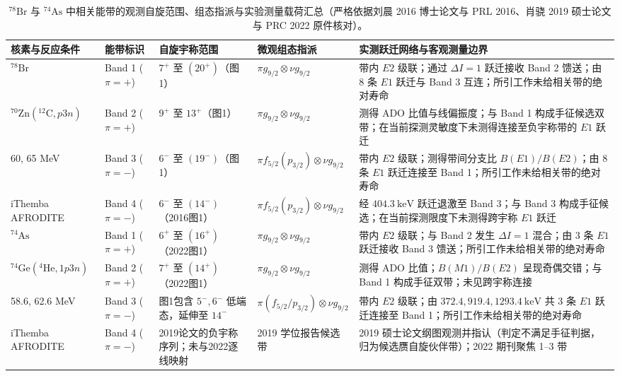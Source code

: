\begin{table}[!htbp]
\centering
\small
\caption{$^{78}\mathrm{Br}$ 与 $^{74}\mathrm{As}$ 中相关能带的观测自旋范围、组态指派与实验测量载荷汇总（严格依据刘晨 2016 博士论文与 PRL 2016、肖骁 2019 硕士论文与 PRC 2022 原件核对）。}\label{tab:4-5-bands-summary}
\begin{tabularx}{\textwidth}{llp{2.6cm}p{3.2cm}X}
\hline\hline
核素与反应条件 & 能带标识 & 自旋宇称范围 & 微观组态指派 & 实测跃迁网络与客观测量边界 \\
\hline
$^{78}\mathrm{Br}$ & Band 1 ($\pi=+$) & $7^+$ 至 $(20^+)$（图1） & $\pi g_{9/2} \otimes \nu g_{9/2}$ & 带内 $E2$ 级联；通过 $\Delta I=1$ 跃迁接收 Band 2 馈送；由 8 条 $E1$ 跃迁与 Band 3 互连；所引工作未给相关带的绝对寿命 \\
$^{70}\mathrm{Zn}(^{12}\mathrm{C}, p3n)$ & Band 2 ($\pi=+$) & $9^+$ 至 $13^+$（图1） & $\pi g_{9/2} \otimes \nu g_{9/2}$ & 测得 ADO 比值与线偏振度；与 Band 1 构成手征候选双带；在当前探测灵敏度下未测得连接至负宇称带的 $E1$ 跃迁 \\
60, 65 MeV & Band 3 ($\pi=-$) & $6^-$ 至 $(19^-)$（图1） & $\pi f_{5/2}(p_{3/2}) \otimes \nu g_{9/2}$ & 带内 $E2$ 级联；测得带间分支比 $B(E1)/B(E2)$；由 8 条 $E1$ 跃迁连接至 Band 1；所引工作未给相关带的绝对寿命 \\
iThemba AFRODITE & Band 4 ($\pi=-$) & $6^-$ 至 $(14^-)$（2016图1） & $\pi f_{5/2}(p_{3/2}) \otimes \nu g_{9/2}$ & 经 $404.3\ \mathrm{keV}$ 跃迁退激至 Band 3；与 Band 3 构成手征候选；在当前探测限度下未测得跨宇称 $E1$ 跃迁 \\
\hline
$^{74}\mathrm{As}$ & Band 1 ($\pi=+$) & $6^+$ 至 $(16^+)$（2022图1） & $\pi g_{9/2} \otimes \nu g_{9/2}$ & 带内 $E2$ 级联；与 Band 2 发生 $\Delta I=1$ 混合；由 3 条 $E1$ 跃迁接收 Band 3 馈送；所引工作未给相关带的绝对寿命 \\
$^{74}\mathrm{Ge}(^4\mathrm{He}, 1p3n)$ & Band 2 ($\pi=+$) & $7^+$ 至 $(14^+)$（2022图1） & $\pi g_{9/2} \otimes \nu g_{9/2}$ & 测得 ADO 比值；$B(M1)/B(E2)$ 呈现奇偶交错；与 Band 1 构成手征双带；未见跨宇称连接 \\
58.6, 62.6 MeV & Band 3 ($\pi=-$) & 图1包含 $5^-,6^-$ 低端态，延伸至 $14^-$ & $\pi(f_{5/2}/p_{3/2}) \otimes \nu g_{9/2}$ & 带内 $E2$ 级联；由 $372.4, 919.4, 1293.4\ \mathrm{keV}$ 共 3 条 $E1$ 跃迁连接至 Band 1；所引工作未给相关带的绝对寿命 \\
iThemba AFRODITE & Band 4 ($\pi=-$) & 2019论文的负宇称序列；未与2022逐线映射 & 2019 学位报告候选带 & 2019 硕士论文纲图观测并指认（判定不满足手征判据，归为候选赝自旋伙伴带）；2022 期刊聚焦 1--3 带 \\
\hline\hline
\end{tabularx}
\end{table}

